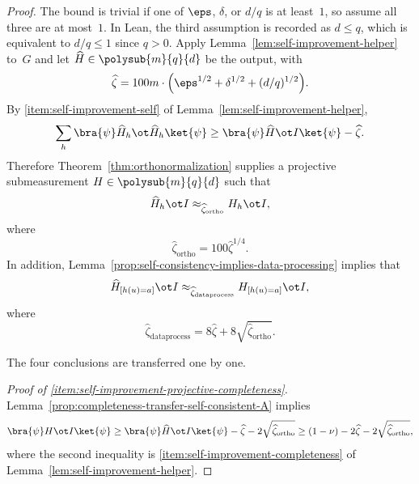 \begin{proof}
  \leanok
  The bound is trivial if one of $\eps$, $\delta$, or $d/q$ is at least~$1$, so assume all three are at most~$1$.  In Lean, the third assumption is recorded as $d \le q$, which is equivalent to $d/q \le 1$ since $q>0$. Apply Lemma~\ref{lem:self-improvement-helper} to~$G$ and let $\widehat H \in \polysub{m}{q}{d}$ be the output, with
  \[
    \widehat{\zeta} = 100m \cdot \Big(\eps^{1/2} + \delta^{1/2} + (d/q)^{1/2}\Big).
  \]
  By \ref{item:self-improvement-self} of Lemma~\ref{lem:self-improvement-helper},
  \[
    \sum_{h} \bra{\psi} \widehat{H}_h \ot \widehat{H}_h \ket{\psi}
    \geq \bra{\psi} \widehat{H} \ot I \ket{\psi} - \widehat{\zeta}.
  \]
  Therefore Theorem~\ref{thm:orthonormalization} supplies a projective submeasurement $H \in \polysub{m}{q}{d}$ such that
  \begin{equation}\label{eq:approx-between-H-with-and-without-hat}
    \widehat{H}_h \ot I \approx_{\widehat{\zeta}_{\mathrm{ortho}}} H_{h} \ot I,
  \end{equation}
  where
  \[
    \widehat{\zeta}_{\mathrm{ortho}} = 100 \widehat{\zeta}^{1/4}.
  \]
  In addition, Lemma~\ref{prop:self-consistency-implies-data-processing} implies that
  \begin{equation}\label{eq:approx-data-processed}
    \widehat{H}_{[h(u)=a]} \ot I \approx_{\widehat{\zeta}_{\mathrm{dataprocess}}} H_{[h(u)=a]} \ot I,
  \end{equation}
  where
  \[
    \widehat{\zeta}_{\mathrm{dataprocess}} = 8 \widehat{\zeta} + 8 \sqrt{\widehat{\zeta}_{\mathrm{ortho}}}.
  \]

  The four conclusions are transferred one by one.

  \emph{Proof of \ref{item:self-improvement-projective-completeness}.}
  Lemma~\ref{prop:completeness-transfer-self-consistent-A} implies
  \[
    \bra{\psi} H \ot I \ket{\psi}
    \geq \bra{\psi} \widehat{H} \ot I \ket{\psi} - \widehat{\zeta} - 2\sqrt{\widehat{\zeta}_{\mathrm{ortho}}}
    \geq (1-\nu) - 2\widehat{\zeta} - 2\sqrt{\widehat{\zeta}_{\mathrm{ortho}}},
  \]
  where the second inequality is \ref{item:self-improvement-completeness} of Lemma~\ref{lem:self-improvement-helper}.


\end{proof}
